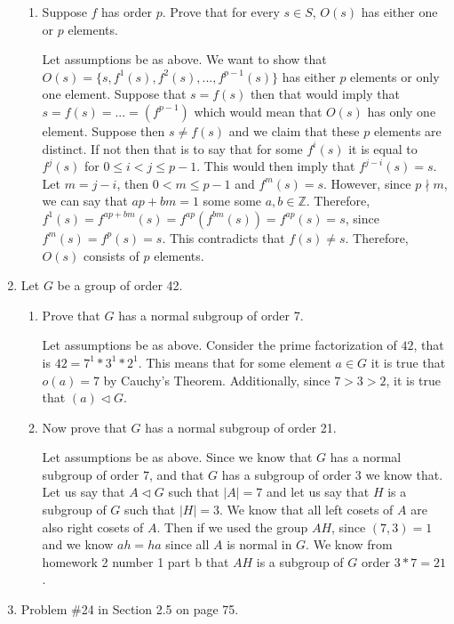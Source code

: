 \documentclass[11pt]{article}
\newcommand{\Z}{\mathbb{Z}}
\begin{document}
\begin{enumerate}
\begin{enumerate}
\item Suppose $f$ has order $p$.  Prove that for every $s \in S$,
$O(s)$ has either one or $p$ elements.

Let assumptions be as above. We want to show that $O(s) = \{s, f^1(s), f^2(s),..., f^{p-1}(s)\}$ has either $p$ elements or only one element. Suppose that $s = f(s)$ then that would imply that $s=f(s)=...=(f^{p-1})$ which would mean that $O(s)$ has only one element. Suppose then $s \neq f(s)$ and we claim that these $p$ elements are distinct. If not then that is to say that for some $f^i(s)$ it is equal to $f^j(s)$ for $0\leq i<j\leq p-1$. This would then imply that $f^{j-i}(s)=s.$ Let $m = j - i$, then $0 < m \leq p-1$ and $f^m(s) = s$. However, since $p\nmid m$, we can say that $ap + bm = 1$ some some $a, b\in \Z$. Therefore, $f^1(s) = f^{ap+bm}(s) = f^{ap}(f^{bm}(s)) = f^{ap}(s) = s$, since $f^m(s) = f^p(s)=s$. This contradicts that $f(s) \neq s$. Therefore, $O(s)$ consists of $p$ elements.

\end{enumerate}
\pagebreak

\item Let $G$ be a group of order 42.
\begin{enumerate}
\item Prove that $G$ has a normal subgroup of order 7.

Let assumptions be as above. Consider the prime factorization of $42$, that is $42 = 7^1 * 3^1 * 2^1$. This means that for some element $a\in G$ it is true that $o(a) = 7$ by Cauchy's Theorem. Additionally, since $7 > 3 > 2$, it is true that $(a) \triangleleft G.$

\item Now prove that $G$ has a normal subgroup of order 21.  

Let assumptions be as above. Since we know that $G$ has a normal subgroup of order $7$, and that $G$ has a subgroup of order $3$ we know that. Let us say that $A \triangleleft G$ such that $|A| = 7$ and let us say that $H$ is a subgroup of $G$ such that $|H| = 3$. We know that all left cosets of $A$ are also right cosets of $A$. Then if we used the group $AH$, since $(7, 3) = 1$ and we know $ah = ha$ since all $A$ is normal in $G$. We know from homework 2 number 1 part b that $AH$ is a subgroup of $G$ order $3 * 7 = 21$. 

\end{enumerate}
\pagebreak

\item Problem \#24 in Section 2.5 on page 75.


\end{enumerate}
\end{document}
